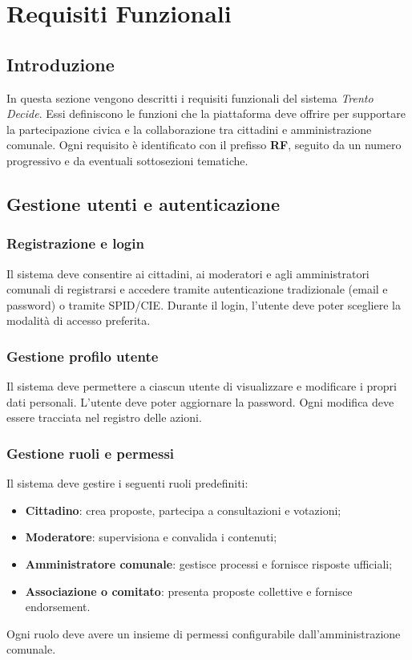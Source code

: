 \chapter{Requisiti Funzionali}

\renewcommand{\thesubsection}{\textbf{RF\arabic{section}.\arabic{subsection}}}

\setlength{\parskip}{0.4em}
\setlength{\parindent}{0pt}

\section{Introduzione}
In questa sezione vengono descritti i requisiti funzionali del sistema \textit{Trento Decide}.  
Essi definiscono le funzioni che la piattaforma deve offrire per supportare la partecipazione civica e la collaborazione tra cittadini e amministrazione comunale.  
Ogni requisito è identificato con il prefisso \textbf{RF}, seguito da un numero progressivo e da eventuali sottosezioni tematiche.

\section{Gestione utenti e autenticazione}

\subsection{Registrazione e login}
Il sistema deve consentire ai cittadini, ai moderatori e agli amministratori comunali di registrarsi e accedere tramite autenticazione tradizionale (email e password) o tramite SPID/CIE.  
Durante il login, l’utente deve poter scegliere la modalità di accesso preferita.

\subsection{Gestione profilo utente}
Il sistema deve permettere a ciascun utente di visualizzare e modificare i propri dati personali.  
L’utente deve poter aggiornare la password.  
Ogni modifica deve essere tracciata nel registro delle azioni.

\subsection{Gestione ruoli e permessi}
Il sistema deve gestire i seguenti ruoli predefiniti:
\begin{itemize}
    \item \textbf{Cittadino}: crea proposte, partecipa a consultazioni e votazioni;
    \item \textbf{Moderatore}: supervisiona e convalida i contenuti;
    \item \textbf{Amministratore comunale}: gestisce processi e fornisce risposte ufficiali;
    \item \textbf{Associazione o comitato}: presenta proposte collettive e fornisce endorsement.
\end{itemize}
Ogni ruolo deve avere un insieme di permessi configurabile dall’amministrazione comunale.

